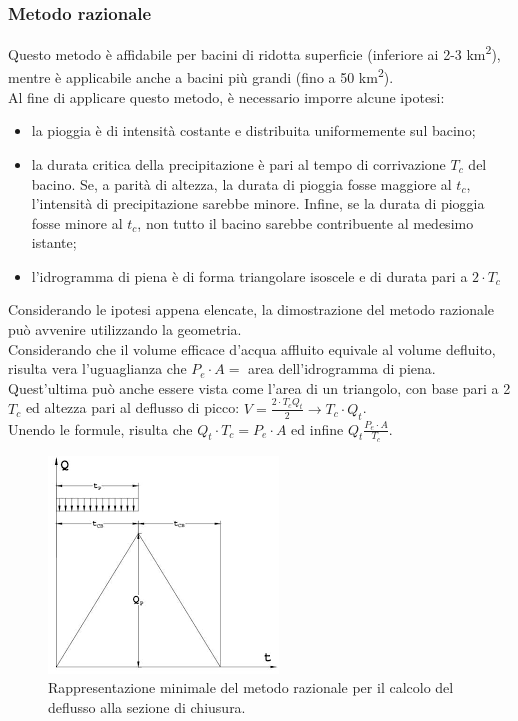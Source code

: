 \subsubsection{Metodo razionale}
Questo metodo è affidabile per bacini di ridotta superficie (inferiore ai 2-3 \unit{km^2}), mentre è applicabile anche a bacini più grandi (fino a 50 \unit{km^2}).\\
Al fine di applicare questo metodo, è necessario imporre alcune ipotesi:
\begin{itemize}
    \item la pioggia è di intensità costante e distribuita uniformemente sul bacino;
    \item la durata critica della precipitazione è pari al tempo di corrivazione $T_c$ del bacino. Se, a parità di altezza, la durata di pioggia fosse maggiore al $t_c$, l'intensità di precipitazione sarebbe minore. Infine, se la durata di pioggia fosse minore al $t_c$, non tutto il bacino sarebbe contribuente al medesimo istante;
    \item l'idrogramma di piena è di forma triangolare isoscele e di durata pari a $2 \cdot T_c$
\end{itemize}
Considerando le ipotesi appena elencate, la dimostrazione del metodo razionale può avvenire utilizzando la geometria.\\
Considerando che il volume efficace d'acqua affluito equivale al volume defluito, risulta vera l'uguaglianza che $P_e \cdot A =$ area dell'idrogramma di piena. Quest'ultima può anche essere vista come l'area di un triangolo, con base pari a 2$T_c$ ed altezza pari al deflusso di picco: $V = \frac{2 \cdot T_c Q_t}{2} \rightarrow T_c \cdot Q_t$.\\
Unendo le formule, risulta che $Q_t \cdot T_c = P_e \cdot A$ ed infine $Q_t \frac{P_e \cdot A}{T_c}$.

\begin{figure}[H]  \centering
    \includegraphics[scale=0.75]{immagini/metodo_razionale_deflusso.png}
    \caption{Rappresentazione minimale del metodo razionale per il calcolo del deflusso alla sezione di chiusura.}
    \label{metodo_razionale_deflusso}
\end{figure}

